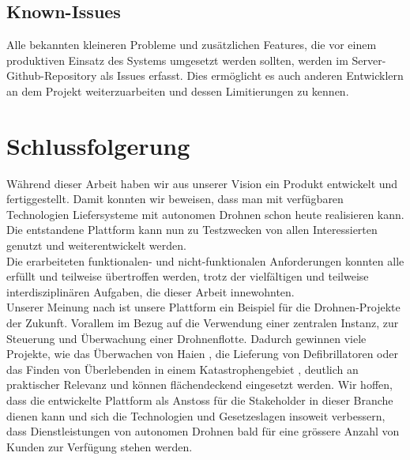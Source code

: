 \subsection{Known-Issues}

Alle bekannten kleineren Probleme und zusätzlichen Features, die vor einem produktiven Einsatz des Systems umgesetzt werden sollten, werden im Server-Github-Repository als Issues erfasst. Dies ermöglicht es auch anderen Entwicklern an dem Projekt weiterzuarbeiten und dessen Limitierungen zu kennen.


\section{Schlussfolgerung}

Während dieser Arbeit haben wir aus unserer Vision ein Produkt entwickelt und fertiggestellt. Damit konnten wir beweisen, dass man mit verfügbaren Technologien Liefersysteme mit autonomen Drohnen schon heute realisieren kann. Die entstandene Plattform kann nun zu Testzwecken von allen Interessierten genutzt und weiterentwickelt werden.\\

Die erarbeiteten funktionalen- und nicht-funktionalen Anforderungen konnten alle erfüllt und teilweise übertroffen werden, trotz der vielfältigen und teilweise interdisziplinären Aufgaben, die dieser Arbeit innewohnten. \\

Unserer Meinung nach ist unsere Plattform ein Beispiel für die Drohnen-Projekte der Zukunft. Vorallem im Bezug auf die Verwendung einer zentralen Instanz, zur Steuerung und Überwachung einer Drohnenflotte. Dadurch gewinnen viele Projekte, wie das Überwachen von Haien \cite{shark}, die Lieferung von Defibrillatoren \cite{defibrillator-drone} oder das Finden von Überlebenden in einem Katastrophengebiet \cite{catastrophic-drone}, deutlich an praktischer Relevanz und können flächendeckend eingesetzt werden. Wir hoffen, dass die entwickelte Plattform als Anstoss für die Stakeholder in dieser Branche dienen kann und sich die Technologien und Gesetzeslagen insoweit verbessern, dass Dienstleistungen von autonomen Drohnen bald für eine grössere Anzahl von Kunden zur Verfügung stehen werden.





